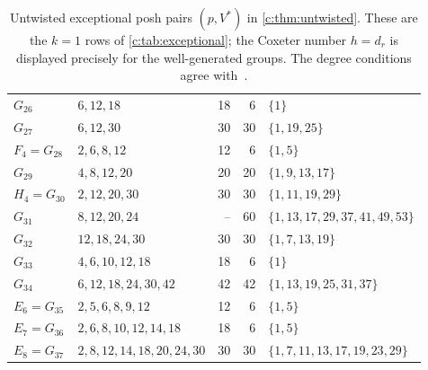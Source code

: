 \documentclass[10pt,a4paper]{amsart}
\theoremstyle{definition}
\begin{document}
\begin{table}[htbp]
\begin{tabular}{@{}lL{.31\textwidth}rrL{.25\textwidth}@{}}
$G_{26}$ & $6,\allowbreak 12,\allowbreak 18$ & 18 & 6 & $\{1\}$ \\
$G_{27}$ & $6,\allowbreak 12,\allowbreak 30$ & 30 & 30 & $\{1,\allowbreak 19,\allowbreak 25\}$ \\
$F_4=G_{28}$ & $2,\allowbreak 6,\allowbreak 8,\allowbreak 12$ & 12 & 6 & $\{1,\allowbreak 5\}$ \\
$G_{29}$ & $4,\allowbreak 8,\allowbreak 12,\allowbreak 20$ & 20 & 20 & $\{1,\allowbreak 9,\allowbreak 13,\allowbreak 17\}$ \\
$H_4=G_{30}$ & $2,\allowbreak 12,\allowbreak 20,\allowbreak 30$ & 30 & 30 & $\{1,\allowbreak 11,\allowbreak 19,\allowbreak 29\}$ \\
$G_{31}$ & $8,\allowbreak 12,\allowbreak 20,\allowbreak 24$ & -- & 60 & $\{1,\allowbreak 13,\allowbreak 17,\allowbreak 29,\allowbreak 37,\allowbreak 41,\allowbreak 49,\allowbreak 53\}$ \\
$G_{32}$ & $12,\allowbreak 18,\allowbreak 24,\allowbreak 30$ & 30 & 30 & $\{1,\allowbreak 7,\allowbreak 13,\allowbreak 19\}$ \\
$G_{33}$ & $4,\allowbreak 6,\allowbreak 10,\allowbreak 12,\allowbreak 18$ & 18 & 6 & $\{1\}$ \\
$G_{34}$ & $6,\allowbreak 12,\allowbreak 18,\allowbreak 24,\allowbreak 30,\allowbreak 42$ & 42 & 42 & $\{1,\allowbreak 13,\allowbreak 19,\allowbreak 25,\allowbreak 31,\allowbreak 37\}$ \\
$E_6=G_{35}$ & $2,\allowbreak 5,\allowbreak 6,\allowbreak 8,\allowbreak 9,\allowbreak 12$ & 12 & 6 & $\{1,\allowbreak 5\}$ \\
$E_7=G_{36}$ & $2,\allowbreak 6,\allowbreak 8,\allowbreak 10,\allowbreak 12,\allowbreak 14,\allowbreak 18$ & 18 & 6 & $\{1,\allowbreak 5\}$ \\
$E_8=G_{37}$ & $2,\allowbreak 8,\allowbreak 12,\allowbreak 14,\allowbreak 18,\allowbreak 20,\allowbreak 24,\allowbreak 30$ & 30 & 30 & $\{1,\allowbreak 7,\allowbreak 11,\allowbreak 13,\allowbreak 17,\allowbreak 19,\allowbreak 23,\allowbreak 29\}$ \\
\bottomrule
\end{tabular}
\caption{Untwisted exceptional posh pairs $(p,V^*)$ in \cref{c:thm:untwisted}. These are the $k=1$ rows of \cref{c:tab:exceptional}; the Coxeter number $h=d_r$ is displayed precisely for the well-generated groups. The degree conditions agree with~\cite[Table 1]{IO}.}\label{tab:exceptional-untwisted}
\end{table}
\endgroup
\end{document}
